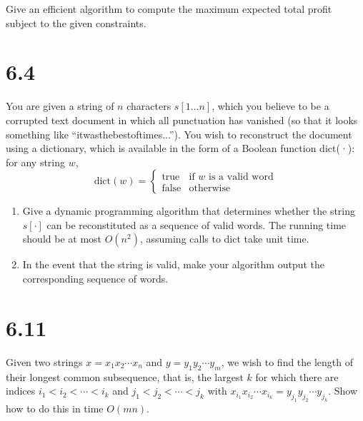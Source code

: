 \documentclass{article}
\begin{document}
Give an efficient algorithm to compute the maximum expected total profit subject to the given constraints.
\section{6.4}

You are given a string of \( n \) characters \( s[1 \ldots n] \), which you believe to be a corrupted text document in which all punctuation has vanished (so that it looks something like “itwasthebestoftimes...”). You wish to reconstruct the document using a dictionary, which is available in the form of a Boolean function dict(·): for any string \( w \),
\[
\text{dict}(w) =
\begin{cases} 
\text{true} & \text{if } w \text{ is a valid word} \\
\text{false} & \text{otherwise}
\end{cases}
\]


\begin{enumerate}
    \item[(a)] Give a dynamic programming algorithm that determines whether the string \( s[\cdot] \) can be reconstituted as a sequence of valid words. The running time should be at most \( O(n^2) \), assuming calls to dict take unit time.
    \item[(b)] In the event that the string is valid, make your algorithm output the corresponding sequence of words.
\end{enumerate}

\section{6.11}
Given two strings \( x = x_1 x_2 \cdots x_n \) and \( y = y_1 y_2 \cdots y_m \), we wish to find the length of their longest common subsequence, that is, the largest \( k \) for which there are indices \( i_1 < i_2 < \cdots < i_k \) and \( j_1 < j_2 < \cdots < j_k \) with \( x_{i_1} x_{i_2} \cdots x_{i_k} = y_{j_1} y_{j_2} \cdots y_{j_k} \). Show how to do this in time \( O(mn) \).
\end{document}
